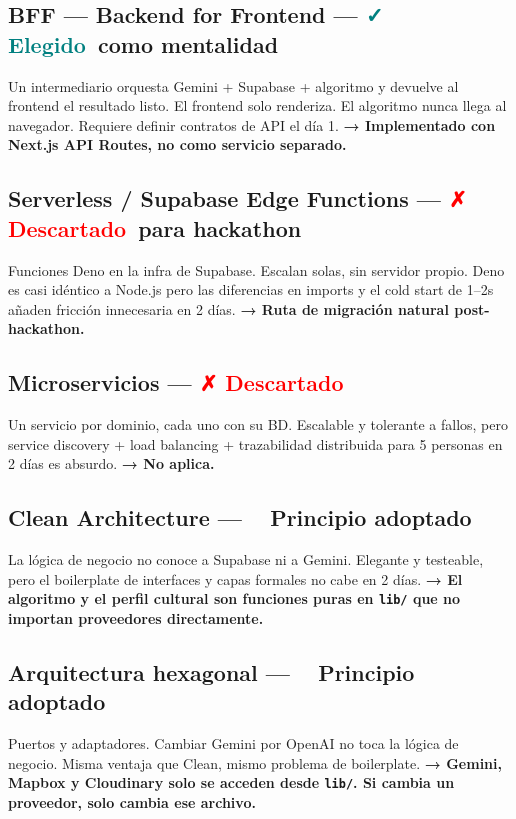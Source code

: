 \documentclass[11pt,a4paper]{article}
\newcommand{\dec}[1]{\textcolor{a}{\textbf{→ #1}}}
\newcommand{\descartado}{\textcolor{red}{\textbf{✗ Descartado}}}
\newcommand{\parcial}{\textcolor{a}{\textbf{~ Principio adoptado}}}
\newcommand{\elegido}{\textcolor{teal}{\textbf{✓ Elegido}}}
\newcommand{\f}[1]{\texttt{\textcolor{d}{#1}}}
\begin{document}
\subsection{BFF — Backend for Frontend — \elegido\ como mentalidad}

Un intermediario orquesta Gemini + Supabase + algoritmo y devuelve al
frontend el resultado listo. El frontend solo renderiza. El algoritmo nunca
llega al navegador. Requiere definir contratos de API el día 1.
\dec{Implementado con Next.js API Routes, no como servicio separado.}

\subsection{Serverless / Supabase Edge Functions — \descartado\ para hackathon}

Funciones Deno en la infra de Supabase. Escalan solas, sin servidor propio.
Deno es casi idéntico a Node.js pero las diferencias en imports y el cold
start de 1--2s añaden fricción innecesaria en 2 días. \dec{Ruta de migración
natural post-hackathon.}

\subsection{Microservicios — \descartado}

Un servicio por dominio, cada uno con su BD. Escalable y tolerante a fallos,
pero service discovery + load balancing + trazabilidad distribuida para 5
personas en 2 días es absurdo. \dec{No aplica.}

\subsection{Clean Architecture — \parcial}

La lógica de negocio no conoce a Supabase ni a Gemini. Elegante y testeable,
pero el boilerplate de interfaces y capas formales no cabe en 2 días.
\dec{El algoritmo y el perfil cultural son funciones puras en \f{lib/}
que no importan proveedores directamente.}

\subsection{Arquitectura hexagonal — \parcial}

Puertos y adaptadores. Cambiar Gemini por OpenAI no toca la lógica de negocio.
Misma ventaja que Clean, mismo problema de boilerplate.
\dec{Gemini, Mapbox y Cloudinary solo se acceden desde \f{lib/}.
Si cambia un proveedor, solo cambia ese archivo.}
\end{document}
